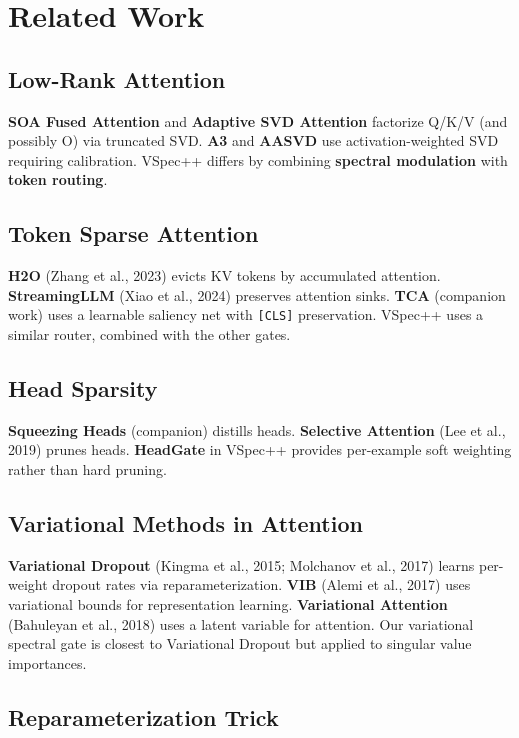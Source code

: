 \section{Related Work}

\subsection{Low-Rank Attention}

\textbf{SOA Fused Attention} and \textbf{Adaptive SVD Attention} factorize Q/K/V 
(and possibly O) via truncated SVD. \textbf{A3} and \textbf{AASVD} use 
activation-weighted SVD requiring calibration. VSpec++ differs by 
combining \textbf{spectral modulation} with \textbf{token routing}.

\subsection{Token Sparse Attention}

\textbf{H2O} (Zhang et al., 2023) evicts KV tokens by accumulated attention. 
\textbf{StreamingLLM} (Xiao et al., 2024) preserves attention sinks. \textbf{TCA} 
(companion work) uses a learnable saliency net with \texttt{[CLS]} preservation. 
VSpec++ uses a similar router, combined with the other gates.

\subsection{Head Sparsity}

\textbf{Squeezing Heads} (companion) distills heads. \textbf{Selective Attention} 
(Lee et al., 2019) prunes heads. \textbf{HeadGate} in VSpec++ provides per-example 
soft weighting rather than hard pruning.

\subsection{Variational Methods in Attention}

\textbf{Variational Dropout} (Kingma et al., 2015; Molchanov et al., 2017) 
learns per-weight dropout rates via reparameterization. \textbf{VIB} (Alemi 
et al., 2017) uses variational bounds for representation learning. 
\textbf{Variational Attention} (Bahuleyan et al., 2018) uses a latent variable 
for attention. Our variational spectral gate is closest to Variational 
Dropout but applied to singular value importances.

\subsection{Reparameterization Trick}

